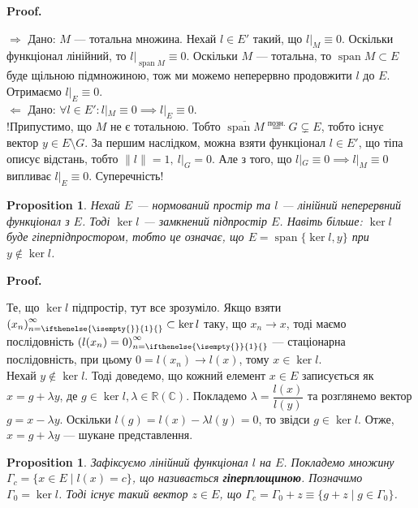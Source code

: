 \documentclass[a4paper, 10pt]{article}
\makeatletter
\def\rightproof{$\boxed{\Rightarrow}$ }
\def\leftproof{$\boxed{\Leftarrow}$ }
\theoremstyle{theoremdd}
\theoremstyle{theoremdd}
\theoremstyle{theoremdd}
\theoremstyle{theoremdd}
\theoremstyle{theoremdd}
\newtheorem{proposition}[theorem]{Proposition}
\theoremstyle{theoremdd}
\theoremstyle{theoremdd}
\theoremstyle{theoremdd}
\newcommand{\sequence}[2][]{\left({#2}\right)_{n=\ifthenelse{\isempty{#1}}{1}{#1}}^{\infty}}
\renewenvironment{proof}[1][Proof.\\]{\par
\pushQED{\hfill \qed}%
\normalfont \topsep6\p@\@plus6\p@\relax
\trivlist
\item\relax
{\bfseries
#1\@addpunct{.}}\hspace\labelsep\ignorespaces
}{%
\popQED\endtrivlist\@endpefalse
}
\DeclareMathOperator{\linspan}{span}
\makeatother
\begin{document}
\begin{proof}
\rightproof Дано: $M$ --- тотальна множина. Нехай $l \in E'$ такий, що $l|_M \equiv 0$. Оскільки функціонал лінійний, то $l|_{\linspan M} \equiv 0$. Оскільки $M$ --- тотальна, то $\linspan M \subset E$ буде щільною підмножиною, тож ми можемо неперервно продовжити $l$ до $E$. Отримаємо $l|_E \equiv 0$.
\bigskip \\
\leftproof Дано: $\forall l \in E': l|_M \equiv 0 \implies l|_E \equiv 0$.\\
!Припустимо, що $M$ не є тотальною. Тобто $\overline{\linspan{M}} \overset{\text{позн.}}{=} G \subsetneq E$, тобто існує вектор $y \in E \setminus G$. За першим наслідком, можна взяти функціонал $l \in E'$, що тіпа описує відстань, тобто $\|l\| = 1,\ l|_G = 0$. Але з того, що $l|_G \equiv 0 \implies l|_M \equiv 0$ випливає $l|_E \equiv 0$. Суперечність!
\end{proof}

\begin{proposition}
\label{kernel_as_subspace}
Нехай $E$ --- нормований простір та $l$ --- лінійний неперервний функціонал з $E$. Тоді $\ker l$ --- замкнений підпростір $E$. Навіть більше: $\ker l$ буде гіперпідпростором, тобто це означає, що $E = \linspan\{\ker l, y\}$ при $y \notin \ker l$.
\end{proposition}

\begin{proof}
Те, що $\ker l$ підпростір, тут все зрозуміло. Якщо взяти $\sequence{x_n} \subset \ker l$ таку, що $x_n \to x$, тоді маємо послідовність $\sequence{l(x_n) = 0}$ --- стаціонарна послідовність, при цьому $0 =l(x_n) \to l(x)$, тому $x \in \ker l$.\\
Нехай $y \notin \ker l$. Тоді доведемо, що кожний елемент $x \in E$ записується як $x = g + \lambda y$, де $g \in \ker l, \lambda \in \mathbb{R} (\mathbb{C})$. Покладемо $\lambda = \dfrac{l(x)}{l(y)}$ та розглянемо вектор $g = x - \lambda y$. Оскільки $l(g) = l(x) - \lambda l(y) = 0$, то звідси $g \in \ker l$. Отже, $x = g + \lambda y$ --- шукане представлення.
\end{proof}

\iffalse %
\begin{proposition}
Зафіксуємо лінійний функціонал $l$ на $E$. Покладемо множину $\Gamma_c = \{x \in E \mid l(x) = c\}$, що називається \textbf{гіперплощиною}. Позначимо $\Gamma_0 = \ker l$. Тоді існує такий вектор $z \in E$, що $\Gamma_c = \Gamma_0 + z \equiv \{g + z \mid g \in \Gamma_0 \}$.
\end{proposition}
\end{document}

